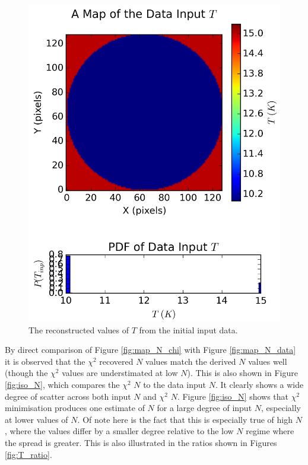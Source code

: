 \documentclass{report}
\begin{document}
\begin{figure}[H]
\begin{minipage}[b]{0.25\linewidth}
    \includegraphics[width=\linewidth]{../img/sim/map_T_data.png}
    \caption{\protect The reconstructed values of $T$ from the initial input data.}\label{fig:map_T_data}
    \vspace{4ex}
  \end{minipage}
\end{figure}

By direct comparison of Figure \ref{fig:map_N_chi} with Figure \ref{fig:map_N_data} it is observed that the $\chi^{2}$ recovered $N$ values match the derived $N$ values well (though the $\chi^{2}$ values are understimated at low $N$). This is also shown in Figure \ref{fig:iso_N}, which compares the $\chi^{2}$ $N$ to the data input $N$. It clearly shows a wide degree of scatter across both input
$N$ and $\chi^{2}$ $N$. Figure \ref{fig:iso_N} shows that $\chi^{2}$ minimisation produces one estimate of $N$ for a large degree of input $N$, especially at lower values of $N$. Of note here is the fact that this is especially true of high $N$, where the values differ by a smaller degree relative to the low $N$ regime where the spread is greater. This is also illustrated in the ratios shown in Figures \ref{fig:T_ratio}.
\end{document}
